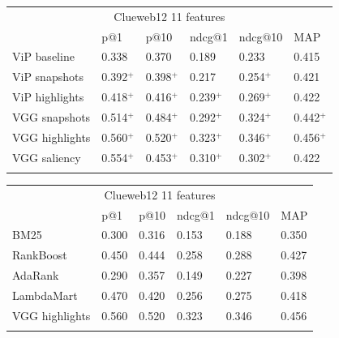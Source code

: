 \begin{table}[t]
\begin{center}
\begin{tabular}{llllll}
\multicolumn{6}{c}{Clueweb12 11 features}                                    \\ 
                      & p@1    & p@10  & ndcg@1  & ndcg@10 & MAP   \\ \hline
ViP baseline          & 0.338  & 0.370 & 0.189   & 0.233   & 0.415 \\ \hline
ViP snapshots         & 0.392$^+$ & 0.398$^+$ & 0.217   & 0.254$^+$   & 0.421 \\ \hline
ViP highlights        & 0.418$^+$  & 0.416$^+$ & 0.239$^+$   & 0.269$^+$   & 0.422 \\
VGG snapshots      & 0.514$^+$    & 0.484$^+$ & 0.292$^+$   & 0.324$^+$   & 0.442$^+$ \\ 
VGG highlights     & 0.560$^+$    & 0.520$^+$ & 0.323$^+$   & 0.346$^+$   & 0.456$^+$ \\ \hline
VGG saliency       & 0.554$^+$    & 0.453$^+$ & 0.310$^+$   & 0.302$^+$   & 0.422 \\  \\
\end{tabular}
\begin{tabular}{llllll}
\multicolumn{6}{c}{Clueweb12 11 features}                                    \\ 
                      & p@1    & p@10  & ndcg@1  & ndcg@10 & MAP   \\ \hline
BM25                  & 0.300  & 0.316 & 0.153   & 0.188   & 0.350 \\ \hline
RankBoost             & 0.450  & 0.444 & 0.258   & 0.288   & 0.427 \\
AdaRank               & 0.290  & 0.357 & 0.149   & 0.227   & 0.398 \\
LambdaMart            & 0.470  & 0.420 & 0.256   & 0.275   & 0.418 \\ \hline
VGG highlights        & 0.560  & 0.520 & 0.323   & 0.346   & 0.456 \\ 
\\
\end{tabular}
\centering
{}
\label{tab:results}
\end{center}
\end{table}



